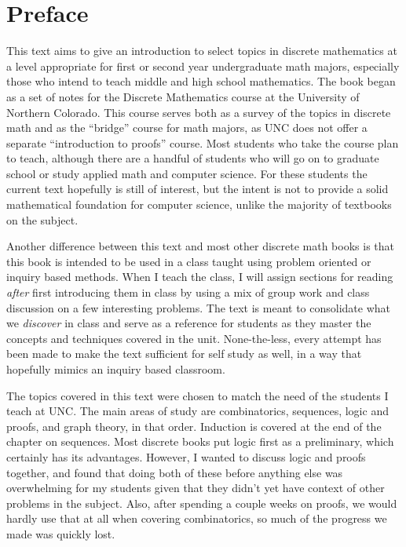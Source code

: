 
\chapter{Preface}

This text aims to give an introduction to select topics in discrete mathematics at a level appropriate for first or second year undergraduate math majors, especially those who intend to teach middle and high school mathematics.  The book began as a set of notes for the Discrete Mathematics course at the University of Northern Colorado.  This course serves both as a survey of the topics in discrete math and as the ``bridge'' course for math majors, as UNC does not offer a separate ``introduction to proofs'' course.  Most students who take the course plan to teach, although there are a handful of students who will go on to graduate school or study applied math and computer science.  For these students the current text hopefully is still of interest, but the intent is not to provide a solid mathematical foundation for computer science, unlike the majority of textbooks on the subject.

Another difference between this text and most other discrete math books is that this book is intended to be used in a class taught using problem oriented or inquiry based methods.  When I teach the class, I will assign sections for reading \emph{after} first introducing them in class by using a mix of group work and class discussion on a few interesting problems.  The text is meant to consolidate what we \emph{discover} in class and serve as a reference for students as they master the concepts and techniques covered in the unit.  None-the-less, every attempt has been made to make the text sufficient for self study as well, in a way that hopefully mimics an inquiry based classroom.

The topics covered in this text were chosen to match the need of the students I teach at UNC.  The main areas of study are combinatorics, sequences, logic and proofs, and graph theory, in that order.  Induction is covered at the end of the chapter on sequences.  Most discrete books put logic first as a preliminary, which certainly has its advantages.  However, I wanted to discuss logic and proofs together, and found that doing both of these before anything else was overwhelming for my students given that they didn't yet have context of other problems in the subject.  Also, after spending a couple weeks on proofs, we would hardly use that at all when covering combinatorics, so much of the progress we made was quickly lost.  

